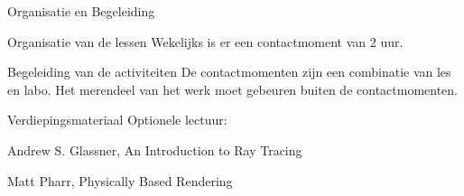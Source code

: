 \documentclass{studiewijzer}
\begin{document}
\showheader

\begin{categorybox}{Organisatie en Begeleiding}
    \begin{category}{Organisatie van de lessen}
        Wekelijks is er een contactmoment van 2 uur.
    \end{category}

    \begin{category}{Begeleiding van de activiteiten}
        De contactmomenten zijn een combinatie van les en labo.
        Het merendeel van het werk moet gebeuren buiten de contactmomenten.
    \end{category}

    \begin{category}{Verdiepingsmateriaal}
        Optionele lectuur:
        \begin{items}
            \item Andrew S. Glassner, An Introduction to Ray Tracing
            \item Matt Pharr, Physically Based Rendering
        \end{items}
    \end{category}
\end{categorybox}
\end{document}
